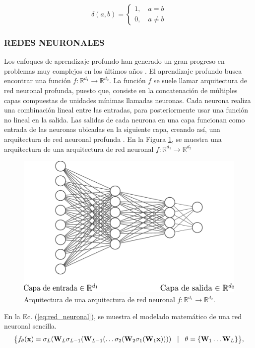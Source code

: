\begin{equation}
    \delta(a,b) = \begin{cases}
        1, \quad a = b \\
        0, \quad a \neq b
    \end{cases}
\end{equation}
\subsubsection{REDES NEURONALES}

Los enfoques de aprendizaje profundo han generado un gran progreso en problemas muy complejos en los últimos años
\cite{he2016deep,li2019deep,li2018deep, wang2019development,wu2016google}. El aprendizaje profundo busca encontrar una función $f: \mathbb{R}^{d_1} \rightarrow \mathbb{R}^{d_2}$. La función $f$ se suele llamar arquitectura de red neuronal profunda, puesto que, consiste en la concatenación de múltiples capas compuestas de unidades mínimas llamadas neuronas. Cada neurona realiza una combinación lineal entre las entradas, para posteriormente usar una función no lineal en la salida. Las salidas de cada neurona en una capa funcionan como entrada de las neuronas ubicadas en la siguiente capa, creando así, una arquitectura de red neuronal profunda \cite{fan2019selective}. En la Figura \ref{fig:nn}, se muestra una arquitectura de una arquitectura de red neuronal $f: \mathbb{R}^{d_1} \rightarrow \mathbb{R}^{d_2}$

\begin{figure}[H]
    \centering
    \includegraphics[width=0.6\linewidth]{images/nn.pdf}
    \caption{\hspace{2mm}Arquitectura de una arquitectura de red neuronal $f: \mathbb{R}^{d_1} \rightarrow \mathbb{R}^{d_2}$.}
    \label{fig:nn}
\end{figure}

En la Ec. (\ref{eq:red_neuronal}), se muestra el modelado matemático de una red neuronal sencilla. 
\begin{equation}
    \footnotesize 
    \big\{f_\theta(\mathbf{x}) = \sigma_{L}(\mathbf{W}_{L}\sigma_{L-1}(\mathbf{W}_{L-1} (\dots \sigma_2(\mathbf{W}_2\sigma_1(\mathbf{W}_1\mathbf{x})))) \quad \vert \quad\theta = \{\mathbf{W}_{1} \dots \mathbf{W}_{L}\}  \big\},
    \label{eq:red_neuronal}
\end{equation}

